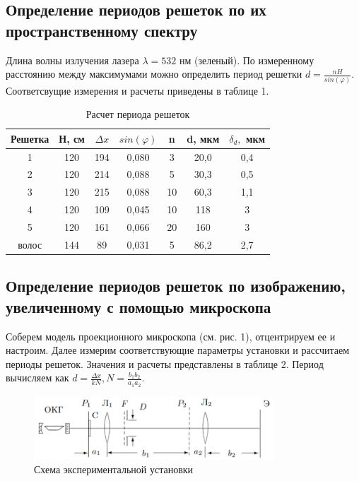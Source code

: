 \documentclass[a4paper, 12pt]{article}
\begin{document}
\subsection{Определение периодов решеток по их пространственному спектру}
Длина волны излучения лазера $\lambda=532$ нм (зеленый). По измеренному расстоянию между максимумами можно определить период решетки $d=\frac{nH}{sin(\varphi)}$. Соответсвущие измерения и расчеты приведены в таблице 1.
\begin{table}[h]
\begin{center}
\caption{Расчет периода решеток}
\begin{tabular}{|c|c|c|c|c|c|c|}
\hline
Решетка & Н, см & $\Delta x$   & $sin(\varphi)$ & n  & d, мкм &  $\delta_{d},$ мкм   \\ \hline
1         & 120   & 194 & 0,080     & 3  & 20,0   & 0,4 \\ \hline
2         & 120   & 214 & 0,088     & 5  & 30,3   & 0,5 \\ \hline
3         & 120   & 215 & 0,088     & 10 & 60,3   & 1,1 \\ \hline
4         & 120   & 109 & 0,045     & 10 & 118    & 3   \\ \hline
5         & 120   & 161 & 0,066     & 20 & 160    & 3   \\ \hline
волос     & 144   & 89  & 0,031     & 5  & 86,2   & 2,7 \\ \hline
\end{tabular}
\end{center}
\end{table} %

\subsection{Определение периодов решеток по изображению, увеличенному с помощью микроскопа}
Соберем модель проекционного микроскопа (см. рис. 1), отцентрируем ее и настроим. Далее измерим соответствующие параметры установки и рассчитаем периоды решеток. Значения и расчеты представлены в таблице 2. Период вычисляем как $d = \frac{\Delta x}{kN}, N =
\frac{b_{1} b_{2}}{a_{1} a_{2}}$.
\begin{figure}[h!]
    \begin{center}
    \includegraphics[width=0.8\textwidth]{ust.png}
    \end{center}
    \caption{Схема экспериментальной установки}
\end{figure} %
\end{document}
